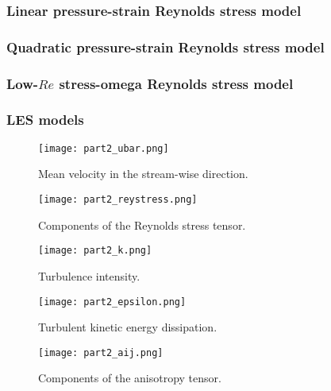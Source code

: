 \documentclass[11pt]{article}
\begin{document}
\subsubsection{Linear pressure-strain Reynolds stress model}

\subsubsection{Quadratic pressure-strain Reynolds stress model}

\subsubsection{Low-$Re$ stress-omega Reynolds stress model}

\subsubsection{LES models}


\begin{figure}[p]
\centering
\texttt{[image: part2\_ubar.png]}
\vspace{6pt}
\caption{Mean velocity in the stream-wise direction.}
\label{fig:part2_ubar}
\end{figure}

\begin{figure}[p]
\centering
\texttt{[image: part2\_reystress.png]}
\vspace{6pt}
\caption{Components of the Reynolds stress tensor.}
\label{fig:part2_reystress}
\end{figure}

\begin{figure}[p]
\centering
\texttt{[image: part2\_k.png]}
\vspace{6pt}
\caption{Turbulence intensity.}
\label{fig:part2_k}
\end{figure}

\begin{figure}[p]
\centering
\texttt{[image: part2\_epsilon.png]}
\vspace{6pt}
\caption{Turbulent kinetic energy dissipation.}
\label{fig:part2_epsilon}
\end{figure}

\begin{figure}[p]
\centering
\texttt{[image: part2\_aij.png]}
\vspace{6pt}
\caption{Components of the anisotropy tensor.}
\label{fig:part2_aij}
\end{figure}
\end{document}
